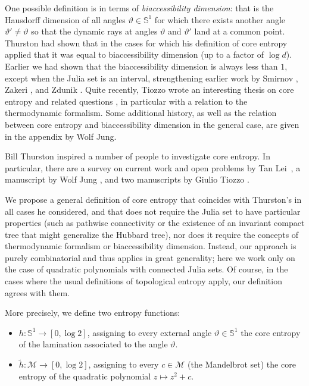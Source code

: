 \documentclass[12pt]{amsart}
\newcommand{\M}{\mathscr M}
\newcommand{\Circle}{\mathbb S^1}
\newcommand{\0}{\texttt{0}}
\newcommand{\1}{\texttt{1}}
\theoremstyle{definition}
\numberwithin{equation}{section}
\renewcommand{\theta}{\vartheta}
\begin{document}
One possible definition is in terms of \emph{biaccessibility dimension}: that is the Hausdorff dimension of all angles $\theta\in\Circle$ for which there exists another angle $\theta'\neq\theta$ so that the dynamic rays at angles $\theta$ and $\theta'$ land at a common point. Thurston had shown that in the cases for which his definition of core entropy applied that it was equal to biaccessibility dimension (up to a factor of $\log d$). Earlier we had shown \cite{MeerkampSchleicher} that the biaccessibility dimension is always less than $1$, except when the Julia set is an interval, strengthening earlier work by Smirnov \cite{Smirnov}, Zakeri \cite{Zakeri}, and Zdunik \cite{Zdunik}.
Quite recently, Tiozzo wrote an interesting thesis on core entropy and related questions \cite{TiozzoThesis}, in particular with a relation to the thermodynamic formalism. Some additional history, as well as the relation between core entropy and biaccessibility dimension in the general case, are given in the appendix by Wolf Jung.

Bill Thurston inspired a number of people to investigate core entropy. In particular, there are a survey on current work and open problems by Tan Lei~\cite{TanLeiEntropy}, a manuscript by Wolf Jung \cite{Jung}, and two manuscripts by Giulio Tiozzo \cite{TiozzoThesis,TiozzoPaper}. 


We propose a general definition of core entropy that coincides with Thurston's in all cases he considered, and that does not require the Julia set to have particular properties (such as pathwise connectivity or the existence of an invariant compact tree that might generalize the Hubbard tree), nor does it require the concepts of thermodynamic formalism or biaccessibility dimension. Instead, our approach is purely combinatorial and thus applies in great generality; here we work only on the case of quadratic polynomials with connected Julia sets. Of course, in the cases where the usual definitions of topological entropy apply, our definition agrees with them.  


More precisely, we define two entropy functions:
\begin{itemize}
\item $h\colon \Circle\to [0,\log 2]$, assigning to every external angle $\theta\in\Circle$ the core entropy of the lamination associated to the angle $\theta$.
\item $\tilde h\colon \M\to[0,\log2]$, assigning to every $c\in\M$ (the Mandelbrot set) the core entropy of the quadratic polynomial $z\mapsto z^2+c$. 
\end{itemize}
\end{document}
